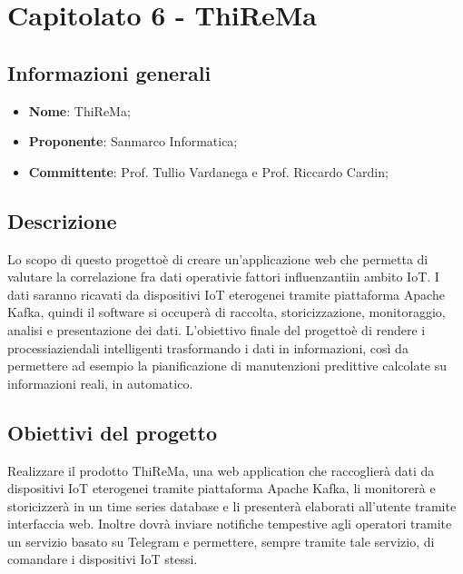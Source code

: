 \section{Capitolato 6 - ThiReMa}
\subsection{Informazioni generali}
\begin{itemize}
	\item \textbf{Nome}: ThiReMa;
	\item \textbf{Proponente}: Sanmarco Informatica;
	\item \textbf{Committente}: Prof. Tullio Vardanega e Prof. Riccardo Cardin;
\end{itemize}
\subsection{Descrizione}
Lo scopo di questo progetto\glosp è di creare un'applicazione web che permetta di valutare la correlazione fra dati operativi\glosp e fattori influenzanti\glosp in ambito IoT. I dati saranno ricavati da dispositivi IoT eterogenei tramite piattaforma Apache Kafka, quindi il software si occuperà di raccolta, storicizzazione, monitoraggio, analisi e presentazione dei dati.
L'obiettivo finale del progetto\glosp è di rendere i processi\glosp aziendali intelligenti trasformando i dati in informazioni, così da permettere ad esempio la pianificazione di manutenzioni predittive calcolate su informazioni reali, in automatico.

\subsection{Obiettivi del progetto}
Realizzare il prodotto ThiReMa, una web application che raccoglierà dati da dispositivi IoT eterogenei tramite piattaforma Apache Kafka, li monitorerà e storicizzerà in un time series database e li presenterà elaborati all'utente tramite interfaccia web. Inoltre dovrà inviare notifiche tempestive agli operatori tramite un servizio basato su Telegram e permettere, sempre tramite tale servizio, di comandare i dispositivi IoT stessi.

